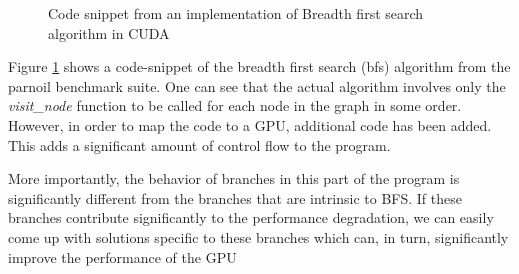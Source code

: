 
\begin{figure}
	
	\caption{Code snippet from an implementation of Breadth first search algorithm in CUDA \label{fig:bfs-kernel}}
\end{figure}

\par{Figure \ref{fig:bfs-kernel} shows a code-snippet of the breadth first search (bfs) algorithm from the parnoil benchmark suite. One can see that the actual algorithm involves only the \textit{visit\_node} function to be called for each node in the graph in some order. However, in order to map the code to a GPU, additional code has been added. This adds a significant amount of control flow to the program.}

\par{More importantly, the behavior of branches in this part of the program is significantly different from the branches that are intrinsic to BFS. If these branches contribute significantly to the performance degradation, we can easily come up with solutions specific to these branches which can, in turn, significantly improve the performance of the GPU}
